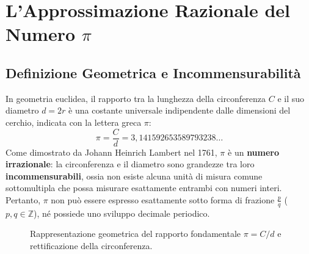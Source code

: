 \documentclass[11pt,a4paper,oneside]{report}
\begin{document}
\chapter{L'Approssimazione Razionale del Numero \texorpdfstring{$\pi$}{pi}}

\section{Definizione Geometrica e Incommensurabilit\`a}
\begin{definizione}
In geometria euclidea, il rapporto tra la lunghezza della circonferenza $C$ e il suo diametro $d = 2r$ \`e una costante universale indipendente dalle dimensioni del cerchio, indicata con la lettera greca $\pi$:
\[
\pi = \frac{C}{d} = 3{,}141592653589793238\dots
\]
Come dimostrato da Johann Heinrich Lambert nel 1761, $\pi$ \`e un \textbf{numero irrazionale}: la circonferenza e il diametro sono grandezze tra loro \textbf{incommensurabili}, ossia non esiste alcuna unit\`a di misura comune sottomultipla che possa misurare esattamente entrambi con numeri interi.
Pertanto, $\pi$ non pu\`o essere espresso esattamente sotto forma di frazione $\frac{p}{q}$ ($p, q \in \mathbb{Z}$), n\'e possiede uno sviluppo decimale periodico.
\end{definizione}

\begin{figure}[H]
\centering
{}
\caption{Rappresentazione geometrica del rapporto fondamentale $\pi = C/d$ e rettificazione della circonferenza.}
\end{figure}
\end{document}
